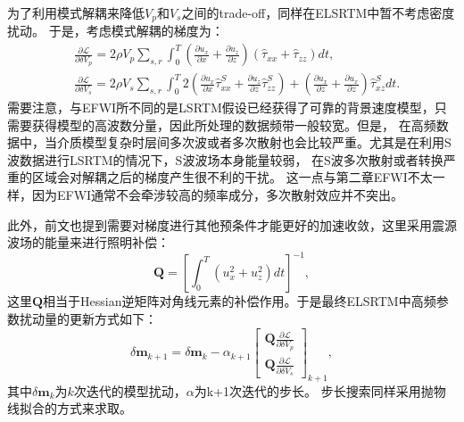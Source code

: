 为了利用模式解耦来降低$V_p$和$V_s$之间的trade-off，同样在ELSRTM中暂不考虑密度扰动。
于是，考虑模式解耦的梯度为：
\begin{equation}
\begin{split}
   & \frac{\partial\mathcal{L}}{\partial \delta V_p}=2\rho V_p\sum_{s,r}\int^T_{0}
	(\frac{\partial u_x}{\partial x}+\frac{\partial u_z}{\partial
	z})(\hat{\tau}_{xx}+\hat{\tau}_{zz})dt,\\
   & \frac{\partial\mathcal{L}}{\partial \delta V_s}=2\rho V_s\sum_{s,r}\int^T_{0}
	2(\frac{\partial u_x}{\partial x}\hat{\tau}^S_{xx}+\frac{\partial u_z}{\partial z}\hat{\tau}^S_{zz})+
	(\frac{\partial u_x}{\partial z}+\frac{\partial u_x}{\partial
	z})\hat{\tau}^S_{xz}dt.
    \label{eq:Gradient_Vel_LSRTM}
\end{split}
\end{equation}
需要注意，与EFWI所不同的是LSRTM假设已经获得了可靠的背景速度模型，只需要获得模型的高波数分量，因此所处理的数据频带一般较宽。但是，
在高频数据中，当介质模型复杂时层间多次波或者多次散射也会比较严重。尤其是在利用S波数据进行LSRTM的情况下，S波波场本身能量较弱，
在S波多次散射或者转换严重的区域会对解耦之后的梯度产生很不利的干扰。
这一点与第二章EFWI不太一样，因为EFWI通常不会牵涉较高的频率成分，多次散射效应并不突出。

此外，前文也提到需要对梯度进行其他预条件才能更好的加速收敛，这里采用震源波场的能量来进行照明补偿：
\begin{equation}
	\mathbf{Q} =\left[\int^T_0(u^2_x+u^2_z)dt\right]^{-1},
    \label{eq:Gradient_Illumination_LSRTM}
\end{equation}
这里$\mathbf{Q}$相当于Hessian逆矩阵对角线元素的补偿作用。于是最终ELSRTM中高频参数扰动量的更新方式如下：
\begin{equation}
	\delta\mathbf{m}_{k+1}=\delta\mathbf{m}_{k}-\alpha_{k+1}
        \begin{bmatrix}\mathbf{Q}{\frac{\partial\mathcal{L}}{\partial \delta V_p}}\\
		\mathbf{Q}{\frac{\partial\mathcal{L}}{\partial \delta V_s}}\end{bmatrix}_{k+1},
        \label{eq:Gradientmethod_LSRTM}
\end{equation}
其中$\delta\mathbf{m}_{k}$为$k$次迭代的模型扰动，$\alpha$为k+1次迭代的步长。
步长搜索同样采用抛物线拟合的方式来求取。
